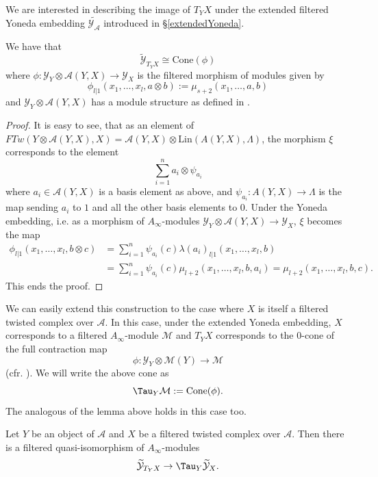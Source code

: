 We are interested in describing the image of $T_Y X$ under the extended filtered Yoneda embedding $\widetilde{\mathcal{Y}_\mathcal{A}}$ introduced in \S\ref{extendedYoneda}.
\begin{lem}
	We have that $$\tilde{\mathcal{Y}}_{T_YX} \cong \text{Cone}(\phi)$$
	where $\phi\colon \mathcal{Y}_Y\otimes \mathcal{A}(Y,X)\to \mathcal{Y}_X$ is the filtered  morphism of modules given by $$\phi_{l|1}(x_1,\ldots, x_l,a\otimes b):= \mu_{s+2}(x_1,\ldots, a,b)$$ and $\mathcal{Y}_Y\otimes \mathcal{A}(Y,X)$ has a module structure as defined in \cite[Section (3c)]{Se:book-fukaya-categ}.
\end{lem}
\begin{proof}
	It is easy to see, that as an element of $FTw(Y\otimes \mathcal{A}(Y,X), X) = \mathcal{A}(Y,X)\otimes \text{Lin}(A(Y,X),\Lambda)$, the morphism $\xi$ corresponds to the element $$\sum_{i=1}^na_i\otimes \psi_{a_i}$$ where $a_i\in \mathcal{A}(Y,X)$ is a basis element as above, and $\psi_{a_i}\colon A(Y,X)\to \Lambda$ is the map sending $a_i$ to $1$ and all the other basis elements to $0$. Under the Yoneda embedding, i.e. as a morphism of $A_\infty$-modules $\mathcal{Y}_Y\otimes \mathcal{A}(Y,X)\to \mathcal{Y}_X$, $\xi$ becomes the map \begin{align*}
		\phi_{l|1}(x_1,\ldots, x_l,b\otimes c) & = \sum_{i=1}^n \psi_{a_i}(c)\lambda(a_i)_{l|1}(x_1,\ldots, x_l,b)\\ & = \sum_{i=1}^n \psi_{a_i}(c)\mu_{l+2}(x_1,\ldots, x_l,b,a_i) = \mu_{l+2}(x_1,\ldots, x_l,b,c).
	\end{align*}
	This ends the proof.
\end{proof}
We can easily extend this construction to the case where $X$ is itself a filtered twisted complex over $\mathcal{A}$. In this case, under the extended Yoneda embedding, $X$ corresponds to a filtered $A_\infty$-module $\mathcal{M}$ and $T_YX$ corresponds to the $0$-cone of the full contraction map $$\phi\colon \mathcal{Y}_Y\otimes \mathcal{M}(Y)\to \mathcal{M}$$ (cfr. \cite[Section (5a)]{Se:book-fukaya-categ}). We will write the above cone as $$\Tau_Y\mathcal{M}:= \text{Cone}(\phi).$$ The analogous of the lemma above holds in this case too.


\begin{lem}
	Let $Y$ be an object of $\mathcal{A}$ and $X$ be a filtered twisted complex over $\mathcal{A}$. Then there is a filtered quasi-isomorphism of $A_\infty$-modules $$\widetilde{\mathcal{Y}}_{T_YX} \to \Tau_Y\widetilde{\mathcal{Y}}_X.$$
\end{lem}
